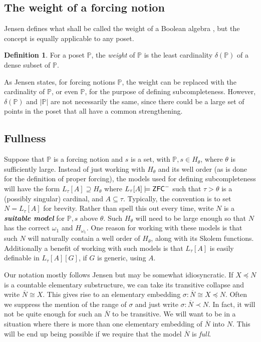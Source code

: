 \documentclass{amsart}
\theoremstyle{definition}
\newtheorem{definition}[theorem]{Definition}
\theoremstyle{remark}
\renewcommand{\P}{\mathbb{P}}
\newcommand{\Q}{\mathbb{Q}}
\newcommand{\N}{{\overline{N}}}
\newcommand{\ZFC}{\textup{\ensuremath{\textsf{ZFC}}}}
\begin{document}
\subsection{The weight of a forcing notion}
\label{subsec:delta}
Jensen defines what shall be called the weight of a Boolean algebra \cite[Section 3.1 p.~31]{Jensen:2014}, but the concept is equally applicable to any poset.

\begin{definition} For a poset $\P$, the \emph{weight} of \(\P\) is the least cardinality $\delta(\P)$ of a dense subset of $\P$. 
\end{definition}

As Jensen states, for forcing notions $\P$, the weight can be replaced with the cardinality of $\P$, or even $\P$, for the purpose of defining subcompleteness. However, $\delta(\P)$ and $|\P|$ are not necessarily the same, since there could be a large set of points in the poset that all have a common strengthening. 




\subsection{Fullness}
\label{subsec:fullness}
Suppose that $\P$ is a forcing notion and $s$ is a set, with $\P, s \in H_\theta$, where $\theta$ is sufficiently large. Instead of just working with $H_\theta$ and its well order (as is done for the definition of proper forcing), the models used for defining subcompleteness will have the form $L_\tau[A] \supseteq H_\theta$ where $L_\tau[A] \models \ZFC^-$ such that $\tau>\theta$ is a (possibly singular) cardinal, and $A \subseteq \tau$. Typically, the convention is to set $N=L_\tau[A]$ for brevity. Rather than spell this out every time, write $N$ is a \emph{\textbf{suitable model}} for $\P,s$ above $\theta$.
Such $H_\theta$ will need to be large enough so that $N$ has the correct $\omega_1$ and $H_{\omega_1}$. One reason for working with these models is that such $N$ will naturally contain a well order of $H_\theta$, along with its Skolem functions. Additionally a benefit of working with such models is that $L_\tau[A]$ is easily definable in $L_\tau[A][G]$, if $G$ is generic, using $A$.

Our notation mostly follows Jensen but may be somewhat idiosyncratic. If $X \preccurlyeq N$ is a countable elementary substructure, we can take its transitive collapse and write $\N \cong X$. This gives rise to an elementary embedding 
$\sigma: \N \cong X \preccurlyeq N.$
Often we suppress the mention of the range of $\sigma$ and just write $\sigma: \N \prec N$.
In fact, it will not be quite enough for such an $\N$ to be transitive. We will want to be in a
situation where there is more than one elementary embedding of \(\N\) into \(N\).
This will be end up being possible if we require that the model \(\N\) is \emph{full}.
\end{document}
